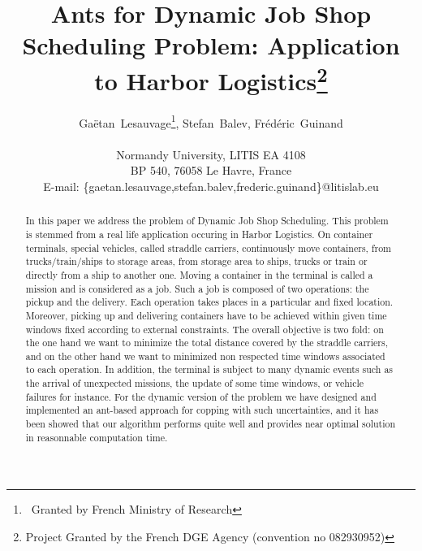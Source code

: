 \documentclass[a4paper,12pt]{article}
\title{Ants for Dynamic Job Shop Scheduling Problem: Application to Harbor Logistics\thanks{Project Granted by the French DGE Agency (convention no 082930952)}
}
\author{Ga\"{e}tan~Lesauvage\thanks{~Granted by French Ministry of Research}, Stefan~Balev, Fr\'{e}d\'{e}ric~Guinand\\\\
\medskip
Normandy University, LITIS EA 4108\\
BP 540, 76058 Le Havre, France\\
\medskip
E-mail: \{gaetan.lesauvage,stefan.balev,frederic.guinand\}@litislab.eu\\
}
\begin{document}
\maketitle

\newpage 

\begin{abstract}

In this paper we address the problem of Dynamic Job Shop Scheduling. This problem is stemmed from a real life application occuring in Harbor Logistics. On container terminals, special vehicles, called straddle carriers, continuously move containers, from trucks/train/ships to storage areas, from storage area to ships, trucks or train or directly from a ship to another one. Moving a container in the terminal is called a mission and is considered as a job. Such a job is composed of two operations: the pickup and the delivery. Each operation takes places in a particular and fixed location. Moreover, picking up and delivering containers have to be achieved within given time windows fixed according to external constraints. The overall objective is two fold: on the one hand we want to minimize the total distance covered by the straddle carriers, and on the other hand we want to minimized non respected time windows associated to each operation. 
% 
In addition, the terminal is subject to many dynamic events such as the arrival of unexpected missions, the update of some time windows, or vehicle failures for instance. For the dynamic version of the problem we have designed and implemented an ant-based approach for copping with such uncertainties, and it has been showed that our algorithm performs quite well and provides near optimal solution in reasonnable computation time.
\end{abstract}
\end{document}
